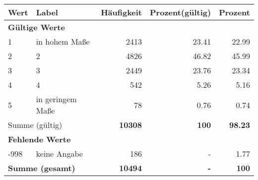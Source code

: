      \begin{longtable}{lXrrr}
     \toprule
     \textbf{Wert} & \textbf{Label} & \textbf{Häufigkeit} & \textbf{Prozent(gültig)} & \textbf{Prozent} \\
     \endhead
     \midrule
     \multicolumn{5}{l}{\textbf{Gültige Werte}}\\

     1 &
     \multicolumn{1}{X}{ in hohem Maße   } &


       \num{2413} &
       \num[round-mode=places,round-precision=2]{23.41} &
         \num[round-mode=places,round-precision=2]{22.99} \\

     2 &
     \multicolumn{1}{X}{ 2   } &


       \num{4826} &
       \num[round-mode=places,round-precision=2]{46.82} &
         \num[round-mode=places,round-precision=2]{45.99} \\

     3 &
     \multicolumn{1}{X}{ 3   } &


       \num{2449} &
       \num[round-mode=places,round-precision=2]{23.76} &
         \num[round-mode=places,round-precision=2]{23.34} \\

     4 &
     \multicolumn{1}{X}{ 4   } &


       \num{542} &
       \num[round-mode=places,round-precision=2]{5.26} &
         \num[round-mode=places,round-precision=2]{5.16} \\

     5 &
     \multicolumn{1}{X}{ in geringem Maße   } &


       \num{78} &
       \num[round-mode=places,round-precision=2]{0.76} &
         \num[round-mode=places,round-precision=2]{0.74} \\
     \midrule
     \multicolumn{2}{l}{Summe (gültig)} &
       \textbf{\num{10308}} &
     \textbf{\num{100}} &
       \textbf{\num[round-mode=places,round-precision=2]{98.23}} \\
     \multicolumn{5}{l}{\textbf{Fehlende Werte}}\\
       -998 &
       keine Angabe &
         \num{186} &
        - &
         \num[round-mode=places,round-precision=2]{1.77} \\
     \midrule
     \multicolumn{2}{l}{\textbf{Summe (gesamt)}} &
          \textbf{\num{10494}} &
        \textbf{-} &
        \textbf{\num{100}} \\
     \bottomrule
     \end{longtable}
     
